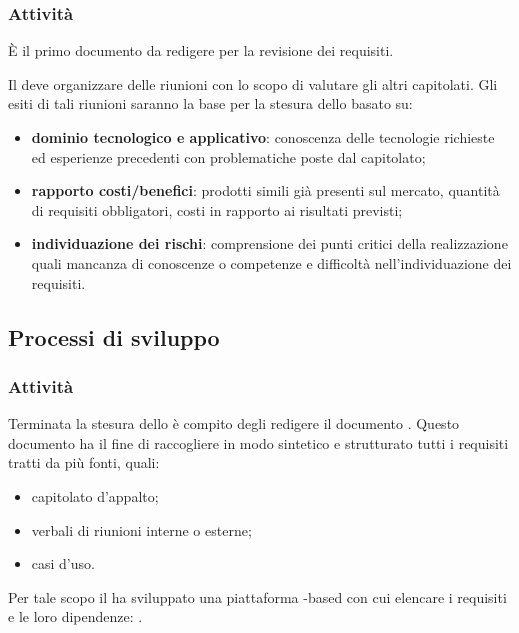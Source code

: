 \documentclass[a4paper, titlepage]{article}
\begin{document}
\subsubsection{Attività}

È il primo documento da redigere per la revisione dei requisiti.

Il  deve organizzare delle riunioni con lo scopo di valutare gli altri capitolati. Gli esiti di tali riunioni saranno la base per la stesura dello  basato su:
\begin{itemize}
	\item \textbf{dominio tecnologico e applicativo}: conoscenza delle tecnologie richieste ed esperienze precedenti con problematiche poste dal capitolato;
	\item \textbf{rapporto costi/benefici}: prodotti simili già presenti sul mercato, quantità di requisiti obbligatori, costi in rapporto ai risultati previsti;
	\item \textbf{individuazione dei rischi}: comprensione dei punti critici della realizzazione quali mancanza di conoscenze o competenze e difficoltà nell'individuazione dei requisiti.
\end{itemize}

\subsection{Processi di sviluppo}

\subsubsection{Attività}

Terminata la stesura dello  è compito degli  redigere il documento . Questo documento ha il fine di raccogliere in modo sintetico e strutturato tutti i requisiti tratti da più fonti, quali: 
\begin{itemize}
	\item capitolato d'appalto;
	\item verbali di riunioni interne o esterne;
	\item casi d'uso.
\end{itemize}

Per tale scopo il  ha sviluppato una piattaforma -based con cui elencare i requisiti e le loro dipendenze: .
\end{document}
